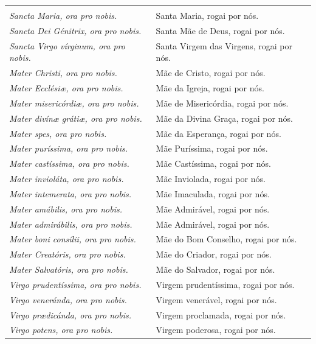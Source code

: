 \documentclass[a4paper,14pt]{extarticle} \usepackage[utf8]{inputenc}
\begin{document}
\begin{center}
\begin{longtable}{p{}|p{}}
\\
\\
\textit{Sancta Maria, ora pro nobis.} & Santa Maria, rogai por nós. \\
\textit{Sancta Dei Génitrix, ora pro nobis.} & Santa Mãe de Deus, rogai por nós. \\
\textit{Sancta Virgo vírginum, ora pro nobis.} & Santa Virgem das Virgens, rogai por nós. \\
\textit{Mater Christi, ora pro nobis.} & Mãe de Cristo, rogai por nós. \\
\textit{Mater Ecclési\ae{}, ora pro nobis.} & Mãe da Igreja, rogai por nós. \\
\textit{Mater misericórdi\ae{}, ora pro nobis.} & Mãe de Misericórdia, rogai por nós. \\
\textit{Mater divín\ae{} gráti\ae{}, ora pro nobis.} & Mãe da Divina Graça, rogai por nós. \\
\textit{Mater spes, ora pro nobis.} & Mãe da Esperança, rogai por nós. \\
\textit{Mater puríssima, ora pro nobis.} & Mãe Puríssima, rogai por nós. \\
\textit{Mater castíssima, ora pro nobis.} & Mãe Castíssima, rogai por nós. \\
\textit{Mater invioláta, ora pro nobis.} & Mãe Inviolada, rogai por nós. \\
\textit{Mater intemerata, ora pro nobis.} & Mãe Imaculada, rogai por nós. \\
\textit{Mater amábilis, ora pro nobis.} & Mãe Admirável, rogai por nós. \\
\textit{Mater admirábilis, ora pro nobis.} & Mãe Admirável, rogai por nós. \\
\textit{Mater boni consílii, ora pro nobis.} & Mãe do Bom Conselho, rogai por nós. \\
\textit{Mater Creatóris, ora pro nobis.} & Mãe do Criador, rogai por nós. \\
\textit{Mater Salvatóris, ora pro nobis.} & Mãe do Salvador, rogai por nós. \\
\textit{Virgo prudentíssima, ora pro nobis.} & Virgem prudentíssima, rogai por nós. \\
\textit{Virgo veneránda, ora pro nobis.} & Virgem venerável, rogai por nós. \\
\textit{Virgo pr\ae{}dicánda, ora pro nobis.} & Virgem proclamada, rogai por nós. \\
\textit{Virgo potens, ora pro nobis.} & Virgem poderosa, rogai por nós. \\

\end{longtable}
\end{center}
\end{document}
